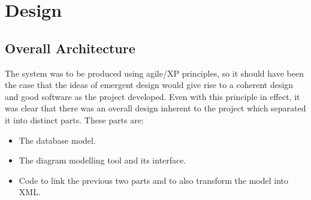 \cleardoublepage
\chapter{Design}%








\section{Overall Architecture}%
The system was to be produced using agile\slash XP principles, so  it should have been the case that the ideas of emergent design would give rise to a coherent design and good software as the project developed. Even with this principle in effect, it was clear that there was an overall design inherent to the project which separated it into distinct parts. These parts are:
\begin{itemize}
	\item The database model.
	\item The diagram modelling tool and its interface.
	\item Code to link the previous two parts and to also transform the model into XML.
\end{itemize}

